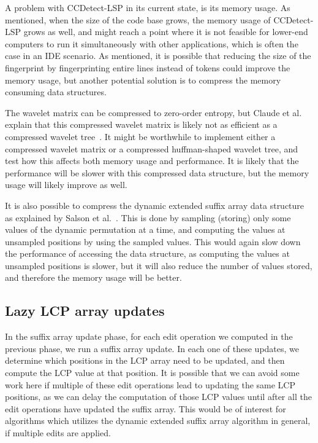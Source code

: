 A problem with CCDetect-LSP in its current state, is its memory usage. As mentioned, when
the size of the code base grows, the memory usage of CCDetect-LSP grows as well, and might
reach a point where it is not feasible for lower-end computers to run it simultaneously
with other applications, which is often the case in an IDE scenario. As mentioned, it is
possible that reducing the size of the fingerprint by fingerprinting entire lines instead
of tokens could improve the memory usage, but another potential solution is to compress
the memory consuming data structures. 

The wavelet matrix can be compressed to zero-order entropy, but Claude et al. explain that
this compressed wavelet matrix is likely not as efficient as a compressed wavelet
tree~\cite{WaveletMatrix}. It might be worthwhile to implement either a compressed wavelet
matrix or a compressed huffman-shaped wavelet tree, and test how this affects both memory
usage and performance. It is likely that the performance will be slower with this
compressed data structure, but the memory usage will likely improve as well.

It is also possible to compress the dynamic extended suffix array data structure as
explained by Salson et al.~\cite{DynamicExtendedSuffixArrays}. This is done by sampling
(storing) only some values of the dynamic permutation at a time, and computing the values
at unsampled positions by using the sampled values. This would again slow down the
performance of accessing the data structure, as computing the values at unsampled
positions is slower, but it will also reduce the number of values stored, and therefore
the memory usage will be better.

\subsection*{Lazy LCP array updates}

In the suffix array update phase, for each edit operation we computed in the previous
phase, we run a suffix array update. In each one of these updates, we determine which
positions in the LCP array need to be updated, and then compute the LCP value at that
position. It is possible that we can avoid some work here if multiple of these edit
operations lead to updating the same LCP positions, as we can delay the computation of
those LCP values until after all the edit operations have updated the suffix array. This
would be of interest for algorithms which utilizes the dynamic extended suffix array
algorithm in general, if multiple edits are applied.

